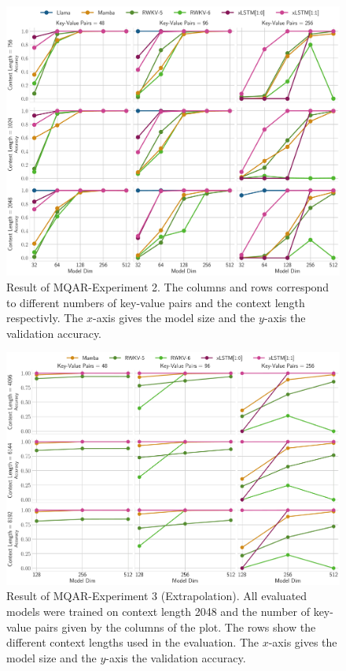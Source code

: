 \documentclass[dvipsnames]{article}
\begin{document}
\begin{appendix}
\begin{figure}[htp]
    \centering
    \includegraphics[width=\textwidth]{figures/MQAR_Appendix_Big.pdf}
    \caption{Result of MQAR-Experiment 2. The columns and rows correspond to different numbers of key-value pairs and the context length respectivly. The $x$-axis gives the model size and 
    the $y$-axis the validation accuracy.}
    \label{fig:mqar-app-big}
\end{figure}

\begin{figure}[htp]
    \centering
    \includegraphics[width=\textwidth]{figures/MQAR_Appendix_Extrapolation.pdf}
    \caption{Result of MQAR-Experiment 3 (Extrapolation). All evaluated models were trained on context length 2048 and the number of key-value pairs given by the columns of the plot. The rows show the different context lengths used in the evaluation. The $x$-axis gives the model size and the $y$-axis the validation accuracy. }
    \label{fig:mqar-app-extrapolate}
\end{figure}


\end{appendix}
\end{document}
